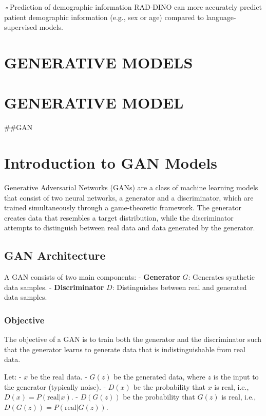 \documentclass[
]{book}
\begin{document}
◦Prediction of demographic information RAD-DINO can more accurately predict patient demographic information (e.g., sex or age) compared to language-supervised models.

\chapter{GENERATIVE MODELS}\label{generative-models}

\chapter{GENERATIVE MODEL}\label{generative-model}

\#\#GAN

\chapter{Introduction to GAN Models}\label{introduction-to-gan-models}

Generative Adversarial Networks (GANs) are a class of machine learning models that consist of two neural networks, a generator and a discriminator, which are trained simultaneously through a game-theoretic framework. The generator creates data that resembles a target distribution, while the discriminator attempts to distinguish between real data and data generated by the generator.

\section{GAN Architecture}\label{gan-architecture}

A GAN consists of two main components:
- \textbf{Generator} \(G\): Generates synthetic data samples.
- \textbf{Discriminator} \(D\): Distinguishes between real and generated data samples.

\subsection{Objective}\label{objective}

The objective of a GAN is to train both the generator and the discriminator such that the generator learns to generate data that is indistinguishable from real data.

Let:
- \(x\) be the real data.
- \(G(z)\) be the generated data, where \(z\) is the input to the generator (typically noise).
- \(D(x)\) be the probability that \(x\) is real, i.e., \(D(x) = P(\text{real}|x)\).
- \(D(G(z))\) be the probability that \(G(z)\) is real, i.e., \(D(G(z)) = P(\text{real}|G(z))\).
\end{document}
